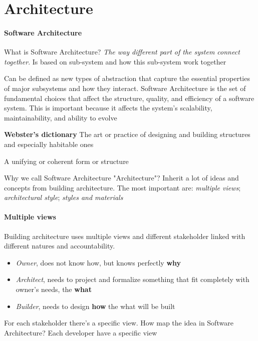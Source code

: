 \section{Architecture}

\paragraph{Software Architecture}
What is Software Architecture? \textit{The way different part of the system connect together}. Is based on sub-system and how this sub-system work together

Can be defined as new types of abstraction that capture the essential
properties of major subsystems and how they interact. Software Architecture is the set of fundamental choices that affect the
structure, quality, and efficiency of a software system. This is important
because it affects the system’s scalability, maintainability, and ability to evolve

\begin{definition}\textbf{Webster's dictionary} The art or practice of designing and building structures and especially habitable ones 
\end{definition}

\begin{definition}
A unifying or coherent form or structure
\end{definition}

Why we call Software Architecture "Architecture"? Inherit a lot of ideas and concepts from building architecture. The most important are: \textit{multiple views}; \textit{architectural style}; \textit{styles and materials}

\paragraph{Multiple views}
Building architecture uses multiple views and different stakeholder linked with different natures and accountability.
\begin{itemize}
    \item \textit{Owner}, does not know how, but knows perfectly \textbf{why}
    \item \textit{Architect}, needs to project and formalize something that fit completely with owner’s needs, the \textbf{what}
    \item \textit{Builder}, needs to design \textbf{how} the what will be built
\end{itemize}
For each stakeholder there’s a specific view. How map the idea in Software Architecture? Each developer have a specific view

